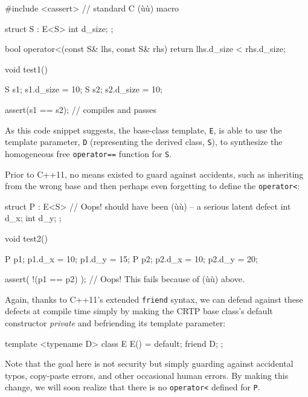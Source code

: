 \begin{emcppshiddenlisting}[emcppsbatch={e5,e6}]
#include <cassert>  // standard C (ù{}ù) macro
\end{emcppshiddenlisting}

\begin{emcppslisting}[emcppsbatch=e5]
struct S : E<S>
{
    int d_size;
};

bool operator<(const S& lhs, const S& rhs)
{
    return lhs.d_size < rhs.d_size;
}

void test1()
{
    S s1; s1.d_size = 10;
    S s2; s2.d_size = 10;

    assert(s1 == s2);  // compiles and passes
}
\end{emcppslisting}
    
\noindent As this code snippet suggests, the base-class template, \lstinline!E!, is
able to use the template parameter, \lstinline!D! (representing the derived
class, \lstinline!S!), to synthesize the homogeneous free
\lstinline!operator==! function for \lstinline!S!.

Prior to C++11, no means existed to guard against accidents, such as
inheriting from the wrong base and then perhaps even forgetting to
define the \lstinline!operator<!:

\begin{emcppslisting}[emcppsbatch=e5]
struct P : E<S>  // Oops! should have been (ù{}ù) -- a serious latent defect
{
    int d_x;
    int d_y;
};

void test2()
{
    P p1; p1.d_x = 10; p1.d_y = 15;
    P p2; p2.d_x = 10; p2.d_y = 20;

    assert( !(p1 == p2) );  // Oops! This fails because of (ù{}ù) above.
}
\end{emcppslisting}
    
\noindent Again, thanks to C++11's extended \lstinline!friend! syntax, we can defend
against these defects at compile time simply by making the CRTP base
class's default constructor \emph{private} and befriending its template
parameter:

\begin{emcppslisting}
template <typename D>
class E
{
     E() = default;
     friend D;
};
\end{emcppslisting}
    
\noindent Note that the goal here is not security but simply guarding against
accidental typos, copy-paste errors, and other occasional  human errors. By making this change, we will soon realize that there
is no \lstinline!operator<! defined for \lstinline!P!.

